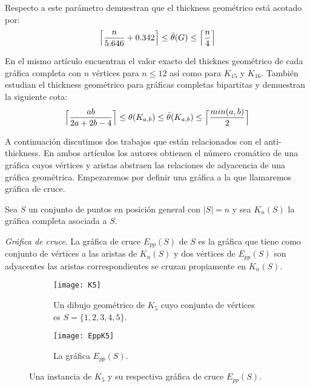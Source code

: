 Respecto a este parámetro \cite{Dillencourt2004} demuestran que el thickness
geométrico está acotado por:
\[ \Bigl\lceil \frac{n}{5.646} + 0.342 \Bigr\rceil \leq  \bar{\theta}(G) \leq \Bigl\lceil\frac{n}{4}\Bigr\rceil \]

En el mismo artículo encuentran el valor exacto del thicknes geométrico
de cada gráfica completa con $n$ vértices para $n\leq 12$ así como para $K_{15}$ y $K_{16}$. También
estudian el thickness geométrico para gráficas completas bipartitas y demuestran la
siguiente cota:
\[
  \Bigl\lceil \frac{ab}{2a+2b-4} \Bigr\rceil \leq \theta(K_{a,b}) \leq \bar{\theta}(K_{a,b})
  \leq \Bigl\lceil \frac{min(a,b)}{2} \Bigr\rceil
\]


A continuación discutimos dos trabajos que están relacionados con el anti-thickness.
En ambos artículos los autores obtienen el número cromático de una gráfica cuyos vértices
y aristas abstraen las relaciones de adyacencia de una gráfica geométrica.
Empezaremos por definir una gráfica a la que llamaremos gráfica de cruce.

Sea $S$ un conjunto de puntos en posición general con $|S|=n$ y sea $K_n(S)$ la gráfica completa
asociada a $S$.
\begin{definition}{\emph{Gráfica de cruce}.}
  La gráfica de cruce $E_{pp}(S)$ de $S$ es la gráfica que tiene como conjunto de vértices
  a las aristas de $K_n(S)$ y dos vértices de $E_{pp}(S)$ son adyacentes las aristas correspondientes
  se cruzan propiamente en $K_n(S)$.
\end{definition}

\begin{figure}
\begin{subfigure}{.5\textwidth}
  \centering
  \texttt{[image: K5]}
  \caption{Un dibujo geométrico de $K_5$ cuyo conjunto de vértices es $S=\{1,2,3,4,5\}$.}
  \label{fig:k5}
\end{subfigure}%
\begin{subfigure}{.5\textwidth}
  \centering
  \texttt{[image: EppK5]}
  \caption{La gráfica $E_{pp}(S)$.}
  \label{fig:eppk5}
\end{subfigure}
\caption{Una instancia de $K_5$ y su respectiva gráfica de cruce $E_{pp}(S)$.}
\label{fig:ejemploeppk5}
\end{figure}

